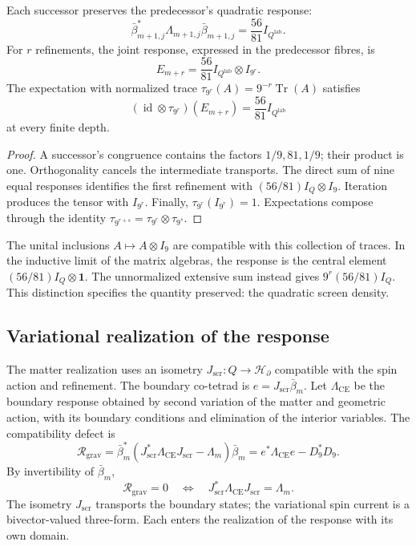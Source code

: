 \begin{theorem}
\label{vii:thm:densidad}
Each successor preserves the predecessor's quadratic response:
\[
 \bar\beta_{m+1,j}^*\Lambda_{m+1,j}\bar\beta_{m+1,j}
 =\frac{56}{81}I_{Q^{\mathrm{lab}}}.
\]
For \(r\) refinements, the joint response, expressed in the predecessor
fibres, is
\[
 E_{m+r}=\frac{56}{81}I_{Q^{\mathrm{lab}}}\otimes I_{9^r}.
\]
The expectation with normalized trace
\(\tau_{9^r}(A)=9^{-r}\operatorname{Tr}(A)\) satisfies
\[
 (\operatorname{id}\otimes\tau_{9^r})(E_{m+r})
 =\frac{56}{81}I_{Q^{\mathrm{lab}}}
\]
at every finite depth.
\end{theorem}

\begin{proof}
A successor's congruence contains the factors \(1/9,81,1/9\);
their product is one. Orthogonality cancels the intermediate
transports. The direct sum of nine equal responses identifies
the first refinement with \((56/81)I_Q\otimes I_9\).
Iteration produces the tensor with \(I_{9^r}\).
Finally, \(\tau_{9^r}(I_{9^r})=1\). Expectations compose
through the identity
\(\tau_{9^{r+s}}=\tau_{9^r}\otimes\tau_{9^s}\).
\end{proof}

The unital inclusions \(A\mapsto A\otimes I_9\) are compatible with
this collection of traces. In the inductive limit of the matrix algebras,
the response is the central element
\((56/81)I_Q\otimes\mathbf1\). The unnormalized extensive sum instead gives
\(9^r(56/81)I_Q\). This distinction specifies the quantity
preserved: the quadratic screen density.

\subsection{Variational realization of the response}
\label{vii:sec:realizacion-respuesta}

The matter realization uses an isometry
\(J_{\mathrm{scr}}:Q\longrightarrow\mathcal H_\partial\)
compatible with the spin action and refinement.
The boundary co-tetrad is \(e=J_{\mathrm{scr}}\bar\beta_m\).
Let \(\Lambda_{\mathrm{CE}}\) be the boundary response obtained
by second variation of the matter and geometric action, with its
boundary conditions and elimination of the interior variables.
The compatibility defect is
\begin{equation}
 \mathcal R_{\mathrm{grav}}
 =\bar\beta_m^*
   (J_{\mathrm{scr}}^*\Lambda_{\mathrm{CE}}J_{\mathrm{scr}}-\Lambda_m)
   \bar\beta_m
 =e^*\Lambda_{\mathrm{CE}}e-D_9^*D_9.
 \label{vii:eq:defecto-respuesta}
\end{equation}
By invertibility of \(\bar\beta_m\),
\[
 \mathcal R_{\mathrm{grav}}=0
 \quad\Longleftrightarrow\quad
 J_{\mathrm{scr}}^*\Lambda_{\mathrm{CE}}J_{\mathrm{scr}}=\Lambda_m.
\]
The isometry \(J_{\mathrm{scr}}\) transports the boundary states;
the variational spin current is a bivector-valued three-form.
Each enters the realization of the response with its own
domain.

